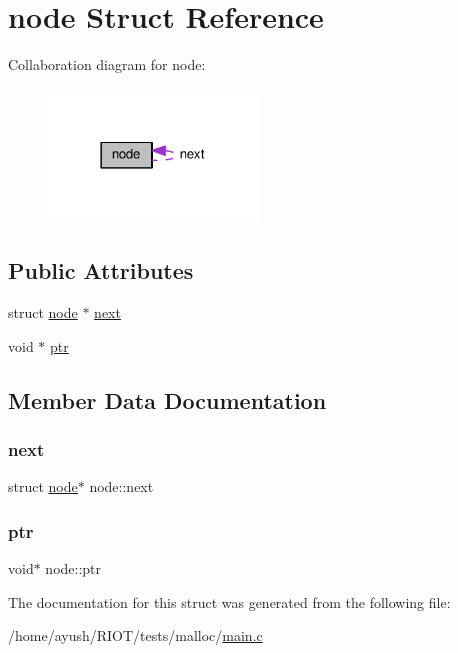 \hypertarget{structnode}{}\section{node Struct Reference}
\label{structnode}


Collaboration diagram for node\+:
\nopagebreak
\begin{figure}[H]
\begin{center}
\leavevmode
\includegraphics[width=158pt]{structnode__coll__graph}
\end{center}
\end{figure}
\subsection*{Public Attributes}
\begin{DoxyCompactItemize}
\item 
struct \hyperlink{structnode}{node} $\ast$ \hyperlink{structnode_aa3e8aa83f864292b5a01210f4453fcc0}{next}
\item 
void $\ast$ \hyperlink{structnode_a2f79f112828fd0f2e744ef33c2ce4dea}{ptr}
\end{DoxyCompactItemize}


\subsection{Member Data Documentation}
\mbox{\label{structnode_aa3e8aa83f864292b5a01210f4453fcc0}} 
\subsubsection{\texorpdfstring{next}{next}}
{\footnotesize\ttfamily struct \hyperlink{structnode}{node}$\ast$ node\+::next}

\mbox{\label{structnode_a2f79f112828fd0f2e744ef33c2ce4dea}} 
\subsubsection{\texorpdfstring{ptr}{ptr}}
{\footnotesize\ttfamily void$\ast$ node\+::ptr}



The documentation for this struct was generated from the following file\+:\begin{DoxyCompactItemize}
\item 
/home/ayush/\+R\+I\+O\+T/tests/malloc/\hyperlink{malloc_2main_8c}{main.\+c}\end{DoxyCompactItemize}
